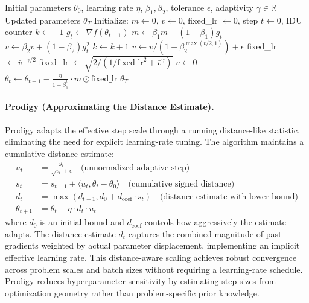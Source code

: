 \documentclass[11pt,a4paper]{article}
\begin{document}
\begin{algorithm}[H]
\caption{Anon (Adaptivity Non-restricted Optimizer with IDU)}
\label{alg:anon}
\begin{algorithmic}[1]
\Require Initial parameters $\theta_0$, learning rate $\eta$, $\beta_1, \beta_2$, tolerance $\epsilon$, adaptivity $\gamma \in \mathbb{R}$
\Ensure Updated parameters $\theta_T$
\State Initialize: $m \gets 0$, $v \gets 0$, fixed\_lr $\gets 0$, step $t \gets 0$, IDU counter $k \gets -1$
    \State $g_t \gets \nabla f(\theta_{t-1})$
    \State $m \gets \beta_1 m + (1-\beta_1) g_t$
    \State $v \gets \beta_2 v + (1-\beta_2) g_t^2$
        \State $k \gets k+1$
        \State $\bar{v} \gets v/(1 - \beta_2^{\max(t/2,1)}) + \epsilon$
            \State fixed\_lr $\gets \bar{v}^{-\gamma/2}$
        \Else
            \State fixed\_lr $\gets \sqrt{2 / (1/\text{fixed\_lr}^2 + \bar{v}^\gamma)}$
        \EndIf
        \State $v \gets 0$
    \EndIf
    \State $\theta_t \gets \theta_{t-1} - \frac{\eta}{1-\beta_1^t} \cdot m \odot \text{fixed\_lr}$
\EndFor
\Return $\theta_T$
\end{algorithmic}
\end{algorithm}

\paragraph{Prodigy (Approximating the Distance Estimate).}
Prodigy adapts the effective step scale through a running distance-like statistic, eliminating the need for explicit learning-rate tuning. The algorithm maintains a cumulative distance estimate:
\begin{align}
u_t &= \frac{g_t}{\sqrt{v_t}+\epsilon} \quad\text{(unnormalized adaptive step)} \\
s_t &= s_{t-1} + \langle u_t, \theta_t - \theta_0 \rangle \quad\text{(cumulative signed distance)} \\
d_t &= \max(d_{t-1}, d_0 + d_{\text{coef}} \cdot s_t) \quad\text{(distance estimate with lower bound)} \\
\theta_{t+1} &= \theta_t - \eta \cdot d_t \cdot u_t
\end{align}
where $d_0$ is an initial bound and $d_{\text{coef}}$ controls how aggressively the estimate adapts. The distance estimate $d_t$ captures the combined magnitude of past gradients weighted by actual parameter displacement, implementing an implicit effective learning rate. This distance-aware scaling achieves robust convergence across problem scales and batch sizes without requiring a learning-rate schedule. Prodigy reduces hyperparameter sensitivity by estimating step sizes from optimization geometry rather than problem-specific prior knowledge.
\end{document}
